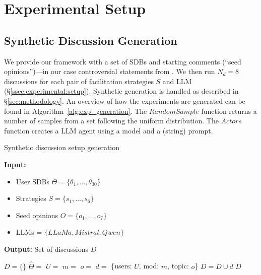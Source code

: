 \section{Experimental Setup}
\label{sec:experimental}

\subsection{Synthetic Discussion Generation}
\label{ssec:appendix:discussion}

We provide our framework with a set of SDBs and starting comments (``seed opinions'')---in our case controversial statements from \citet{pavlopoulos-likas-2024-polarized}. We then run $N_d=8$ discussions for each pair of facilitation strategies $S$ and LLM (\S\ref{ssec:experimental:setup}). Synthetic generation is handled as described in \S\ref{sec:methodology}. An overview of how the experiments are generated can be found in Algorithm~\ref{alg:exp_generation}.  The $RandomSample$ function returns a number of samples from a set following the uniform distribution. The $Actors$ function creates a LLM agent using a model and a (string) prompt.

\begin{algorithm}[t]
	\caption{Synthetic discussion setup generation}
	\label{alg:exp_generation}
	\hspace*{\algorithmicindent} \textbf{Input:} 
	\begin{itemize}[noitemsep, nosep]
		\item User SDBs $\Theta = \{\theta_1, \dots, \theta_{30}\}$
		\item Strategies $S = \{s_1, \ldots, s_6\}$
		\item Seed opinions $O = \{o_1, \ldots, o_7\}$
		\item LLMs = $\{LLaMa, Mistral, Qwen\}$
	\end{itemize}
	\hspace*{\algorithmicindent} \textbf{Output:} Set of discussions $D$
	\begin{algorithmic}[1]
		\State $D = \{\}$
		\State $\hat{\Theta} = $ 
		\State $U =$  
		\State $m = $ 
		\State $o = $ 
		\State $d =$ \{users: $U$, mod: $m$, topic: $o$\}
		\State $D = D \cup d$
		\EndFor
		\EndFor
		\EndFor
		\State \Return $D$
	\end{algorithmic}
\end{algorithm}


